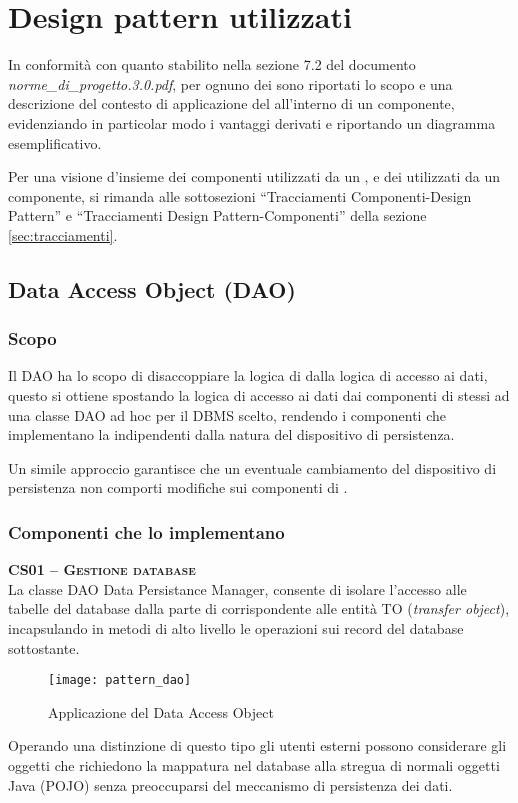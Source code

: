 \section{Design pattern utilizzati}
In conformità con quanto stabilito nella sezione 7.2 del documento \textit{norme\_di\_progetto.3.0.pdf}, per ognuno dei  sono riportati lo scopo e una descrizione del contesto di applicazione del  all'interno di un componente, evidenziando in particolar modo i vantaggi derivati e riportando un diagramma esemplificativo.

Per una visione d'insieme dei componenti utilizzati da un , e dei  utilizzati da un componente, si rimanda alle sottosezioni ``Tracciamenti Componenti-Design Pattern'' e ``Tracciamenti Design Pattern-Componenti'' della sezione \vref{sec:tracciamenti}.

\subsection{Data Access Object (DAO)}\label{sec:patterndao}

\subsubsection{Scopo}
Il  DAO ha lo scopo di disaccoppiare la logica di  dalla logica di accesso ai dati, questo si ottiene spostando la logica di accesso ai dati dai componenti di  stessi ad una classe DAO ad hoc per il DBMS scelto, rendendo i componenti che implementano la  indipendenti dalla natura del dispositivo di persistenza.

Un simile approccio garantisce che un eventuale cambiamento del dispositivo di persistenza non comporti modifiche sui componenti di .

\subsubsection{Componenti che lo implementano}
\begin{description}
\item{\scshape\bfseries CS01 -- Gestione database}\\
La classe DAO Data Persistance Manager, consente di isolare l'accesso alle tabelle del database dalla parte di  corrispondente alle entità TO (\textit{transfer object}), incapsulando in metodi di alto livello le operazioni sui record del database sottostante.

\begin{figure}[H]
  \centering
  \texttt{[image: pattern\_dao]}
  \caption{Applicazione del  Data Access Object}\label{fig:dao}
\end{figure}

Operando una distinzione di questo tipo gli utenti esterni possono considerare gli oggetti che richiedono la mappatura nel database alla stregua di normali oggetti Java (POJO) senza preoccuparsi del meccanismo di persistenza dei dati.
\end{description}

